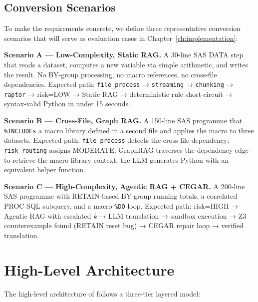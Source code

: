 \subsection{Conversion Scenarios}
\label{subsec:conversion-scenarios}

To make the requirements concrete, we define three representative conversion
scenarios that will serve as evaluation cases in Chapter~\ref{ch:implementation}:

\textbf{Scenario A --- Low-Complexity, Static RAG.} A 30-line SAS DATA step
that reads a dataset, computes a new variable via simple arithmetic, and writes
the result. No BY-group processing, no macro references, no cross-file
dependencies. Expected path: \texttt{file\_process} → \texttt{streaming} →
\texttt{chunking} → \texttt{raptor} → risk=LOW → Static RAG → deterministic
rule short-circuit → syntax-valid Python in under 15 seconds.

\textbf{Scenario B --- Cross-File, Graph RAG.} A 150-line SAS programme that
\texttt{\%INCLUDEs} a macro library defined in a second file and applies the
macro to three datasets. Expected path: \texttt{file\_process} detects the
cross-file dependency; \texttt{risk\_routing} assigns MODERATE; GraphRAG
traverses the dependency edge to retrieve the macro library context; the LLM
generates Python with an equivalent helper function.

\textbf{Scenario C --- High-Complexity, Agentic RAG + CEGAR.} A 200-line
SAS programme with RETAIN-based BY-group running totals, a correlated PROC SQL
subquery, and a macro \texttt{\%DO} loop. Expected path: risk=HIGH → Agentic
RAG with escalated \emph{k} → LLM translation → sandbox execution → Z3
counterexample found (RETAIN reset bug) → CEGAR repair loop → verified
translation.

\section{High-Level Architecture}
\label{sec:high-level-arch}

The high-level architecture of \codara{} follows a three-tier layered model:

